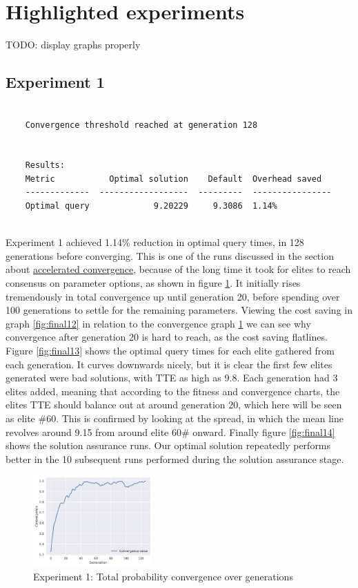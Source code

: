 \documentclass[a4paper,english]{report}
\begin{document}
	\section{Highlighted experiments}
	TODO: display graphs properly
	\subsection{Experiment 1}
	\begin{verbatim}
	
	Convergence threshold reached at generation 128
	
	
	Results:
	Metric           Optimal solution    Default  Overhead saved
	-------------  ------------------  ---------  ----------------
	Optimal query             9.20229     9.3086  1.14%
		
	\end{verbatim}
	Experiment 1 achieved 1.14\% reduction in optimal query times, in 128 generations before converging. This is one of the runs discussed in the section about \hyperref[sec:agnosstable]{accelerated convergence}, because of the long time it took for elites to reach consensus on parameter options, as shown in figure \ref{fig:final11}. It initially rises tremendously in total convergence up until generation 20, before spending over 100 generations to settle for the remaining parameters. Viewing the cost saving in graph \ref{fig:final12} in relation to the convergence graph \ref{fig:final11} we can see why convergence after generation 20 is hard to reach, as the cost saving flatlines. Figure \ref{fig:final13} shows the optimal query times for each elite gathered from each generation. It curves downwards nicely, but it is clear the first few elites generated were bad solutions, with TTE as high as 9.8. Each generation had 3 elites added, meaning that according to the fitness and convergence charts, the elites TTE should balance out at around generation 20, which here will be seen as elite \#60. This is confirmed by looking at the spread, in which the mean line revolves around 9.15 from around elite 60\# onward. Finally figure \ref{fig:final14} shows the solution assurance runs. Our optimal solution repeatedly performs better in the 10 subsequent runs performed during the solution assurance stage.
	\clearpage
	\begin{figure}[H]
		\centering
		\includegraphics[width=130pt]{runlogs/final1/1}
		\caption{Experiment 1: Total probability convergence over generations}
		\label{fig:final11}
	\end{figure}
\end{document}
